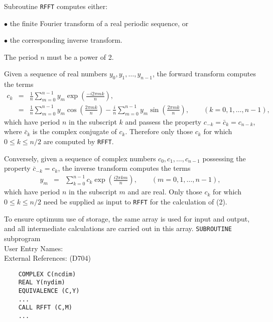                                  
                     
\Submitter{}                                    
Subroutine {\tt RFFT} computes either:
\begin{DLtt}{12}
\item[$\bullet$]  the finite Fourier transform of a real periodic
sequence, or
\item[$\bullet$]  the corresponding inverse transform.
\end{DLtt}
The period $n$ must be a power of 2.
\par
Given a sequence of real numbers $y_0,y_1,\ldots,y_{n-1}$,
the forward transform computes the terms
$$ \begin{array}{rcl}
c_k & = & \displaystyle \frac{1}{n}
\sum_{m=0}^{n-1} y_m \exp \left( \frac{-i 2\pi mk}{n} \right), \\[6mm]
& = & \displaystyle \frac{1}{n}
\sum_{m=0}^{n-1} y_m \cos \left( \frac{2\pi mk}{n} \right) -
\displaystyle \frac{i}{n}
\sum_{m=0}^{n-1} y_m \sin \left( \frac{2\pi mk}{n} \right),
\qquad (k=0,1,\ldots,n-1),
\end{array} $$
which have period $n$ in the subscript $k$ and passess the property
$c_{-k}=\bar{c}_k=c_{n-k}$, where $\bar{c}_k$ is the complex conjugate
of $c_k$. Therefore only those $c_k$ for which $0 \leq k \leq n/2$
are computed by {\tt RFFT}.
\par
Conversely, given a sequence of complex numbers $c_0,c_1,\ldots,c_{n-1}$
possessing the property $\bar{c}_{-k}=c_k$, the inverse transform
computes the terms
$$ \begin{array}{rcl}
y_m & = & \displaystyle
\sum_{k=0}^{n-1} c_k \exp \left( \frac{i 2\pi km}{n} \right),
\qquad (m=0,1,\ldots,n-1),
\end{array} $$
which have period $n$ in the subscript $m$ and are real. Only those
$c_k$ for which $0 \leq k \leq n/2$ need be supplied as input to
{\tt RFFT} for the calculation of (2).
\par
To ensure optimum use of storage, the same array is used for input and
output, and all intermediate calculations are carried out in this array.
\Structure
{\tt SUBROUTINE} subprogram \\
User Entry Names:  \\
External References:  (D704)
\Usage
\begin{verbatim}
    COMPLEX C(ncdim)
    REAL Y(nydim)
    EQUIVALENCE (C,Y)
    ...
    CALL RFFT (C,M)
    ...
\end{verbatim}
